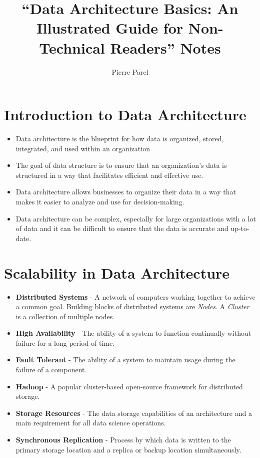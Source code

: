\documentclass[12pt,a4paper]{article}
\title{``Data Architecture Basics: An Illustrated Guide for Non-Technical Readers'' Notes}
\author{Pierre Parel}
\begin{document}
\maketitle

\newpage
\tableofcontents

\newpage
\section{Introduction to Data Architecture}

\begin{itemize} 

	\item Data architecture is the blueprint for how data is organized, stored, integrated, and used within an organization
	\item The goal of data structure is to ensure that an organization's data is structured in a way that facilitates efficient and effective use.
	\item Data architecture allows businesses to organize their data in a way that makes it easier to analyze and use for decision-making.

	\item Data architecture can be complex, especially for large organizations with a lot of data and it can be difficult to ensure that the data is accurate and up-to-date.

\end{itemize}

\section{Scalability in Data Architecture}

\begin{itemize}
	\item \textbf{Distributed Systems} - A network of computers working together to achieve a common goal. Building blocks of distributed systems are \textit{Nodes}. A \textit{Cluster} is a collection of multiple nodes.

	\item \textbf{High Availability} - The ability of a system to function continually without failure for a long period of time.

	\item \textbf{Fault Tolerant} - The ability of a system to maintain usage during the failure of a component.

	\item \textbf{Hadoop} - A popular cluster-based open-source framework for distributed storage.

	\item \textbf{Storage Resources} - The data storage capabilities of an architecture and a main requirement for all data science operations.


	\item \textbf{Synchronous Replication} - Process by which data is written to the primary storage location and a replica or backup location simultaneously.

\end{itemize}
\end{document}
